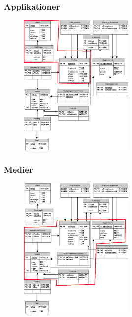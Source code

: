 \documentclass{beamer}
\begin{document}
\begin{frame}
	\frametitle{Applikationer}
	
	\begin{figure}[!h]
		\centering
			\includegraphics[width=0.5\textwidth]{dbApps}
		\label{fig:Applikationer}
	\end{figure}
\end{frame}

\begin{frame}
	\frametitle{Medier}
	
	\begin{figure}[!h]
		\centering
			\includegraphics[width=0.5\textwidth]{dbMedia}
		\label{fig:Medier}
	\end{figure}
\end{frame}
\end{document}
